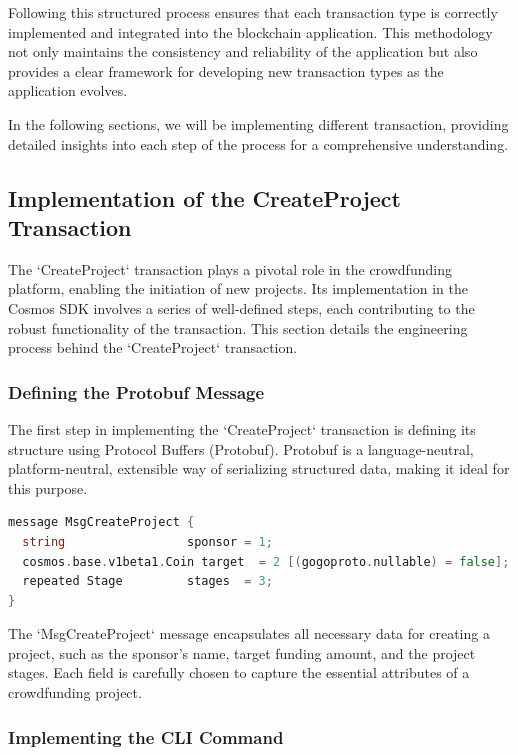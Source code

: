 Following this structured process ensures that each transaction type is correctly implemented and integrated into the blockchain application. This methodology not only maintains the consistency and reliability of the application but also provides a clear framework for developing new transaction types as the application evolves.

In the following sections, we will be implementing different transaction, providing detailed insights into each step of the process for a comprehensive understanding.

\subsection{Implementation of the CreateProject Transaction}
\label{subsec:implementation-createproject}

The `CreateProject` transaction plays a pivotal role in the crowdfunding platform, enabling the initiation of new projects. Its implementation in the Cosmos SDK involves a series of well-defined steps, each contributing to the robust functionality of the transaction. This section details the engineering process behind the `CreateProject` transaction.

\subsubsection{Defining the Protobuf Message}
\label{subsubsec:protobuf-createproject}

The first step in implementing the `CreateProject` transaction is defining its structure using Protocol Buffers (Protobuf). Protobuf is a language-neutral, platform-neutral, extensible way of serializing structured data, making it ideal for this purpose.

\newpage
\begin{lstlisting}[language=go, caption=CreateProject protobuf definition, label={lst:create_project_proto}]
message MsgCreateProject {
  string                 sponsor = 1;
  cosmos.base.v1beta1.Coin target  = 2 [(gogoproto.nullable) = false];
  repeated Stage         stages  = 3;
}
\end{lstlisting}

The `MsgCreateProject` message encapsulates all necessary data for creating a project, such as the sponsor's name, target funding amount, and the project stages. Each field is carefully chosen to capture the essential attributes of a crowdfunding project.

\subsubsection{Implementing the CLI Command}
\label{subsubsec:cli-createproject}

